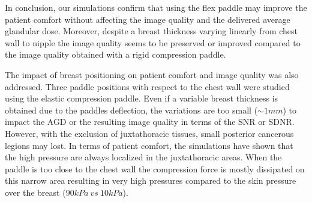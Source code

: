 In conclusion, our simulations confirm that using the flex paddle may improve the patient comfort without affecting the image quality and the delivered average glandular dose. Moreover, despite a breast thickness varying linearly from chest wall to nipple the image quality seems to be preserved or improved compared to the image quality obtained with a rigid compression paddle.

The impact of breast positioning on patient comfort and image quality was also addressed. Three paddle positions with respect to the chest wall were studied using the elastic compression paddle. Even if a variable breast thickness is obtained due to the paddles deflection, the variations are too small ($\sim 1mm$) to impact the AGD or the resulting image quality in terms of the SNR or SDNR. However, with the exclusion of juxtathoracic tissues, small posterior cancerous legions may lost. In terms of patient comfort, the simulations have shown that the high pressure are always localized in the juxtathoracic areas. When the paddle is too close to the chest wall the compression force is mostly dissipated on this narrow area resulting in very high pressures compared to the skin pressure over the breast ($90kPa\ vs\ 10kPa$).
